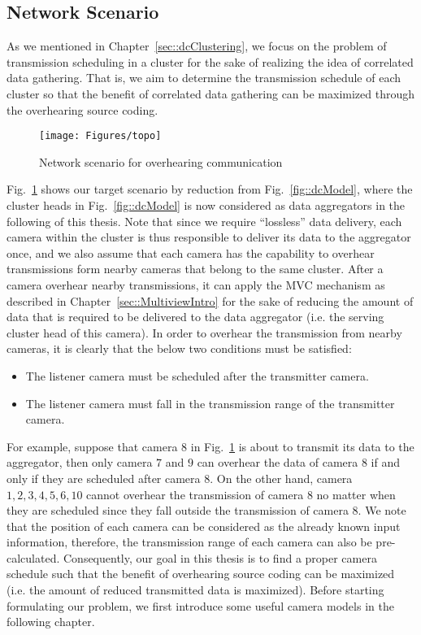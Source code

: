 \subsection{Network Scenario}
\label{sec::networkScenario}
%
As we mentioned in Chapter~\ref{sec::dcClustering}, we focus on the problem of transmission scheduling in a cluster for the sake of realizing the idea of correlated data gathering.
That is, we aim to determine the transmission schedule of each cluster so that the benefit of correlated data gathering can be maximized through the overhearing source coding.
%
\begin{figure}
\centering
\texttt{[image: Figures/topo]}
\caption{\label{fig::sysModel}Network scenario for overhearing communication}
\end{figure}
%
Fig.~\ref{fig::sysModel} shows our target scenario by reduction from Fig.~\ref{fig::dcModel}, where the cluster heads in Fig.~\ref{fig::dcModel} is now considered as data aggregators in the following of this thesis.
Note that since we require ``lossless'' data delivery, each camera within the cluster is thus responsible to deliver its data to the aggregator once, and we also assume that each camera has the capability to overhear transmissions form nearby cameras that belong to the same cluster.
After a camera overhear nearby transmissions, it can apply the MVC mechanism as described in Chapter~\ref{sec::MultiviewIntro} for the sake of reducing the amount of data that is required to be delivered to the data aggregator (i.e. the serving cluster head of this camera).
In order to overhear the transmission from nearby cameras, it is clearly that the below two conditions must be satisfied:
\begin{itemize}
\item The listener camera must be scheduled after the transmitter camera.
\item The listener camera must fall in the transmission range of the transmitter camera.
\end{itemize}
For example, suppose that camera $8$ in Fig.~\ref{fig::sysModel} is about to transmit its data to the aggregator, then only camera $7$ and $9$ can overhear the data of camera $8$ if and only if they are scheduled after camera $8$.
On the other hand, camera ${1,2,3,4,5,6,10}$ cannot overhear the transmission of camera $8$ no matter when they are scheduled since they fall outside the transmission of camera $8$.
We note that the position of each camera can be considered as the already known input information, therefore, the transmission range of each camera can also be pre-calculated.
Consequently, our goal in this thesis is to find a proper camera schedule such that the benefit of overhearing source coding can be maximized (i.e. the amount of reduced transmitted data is maximized).
Before starting formulating our problem, we first introduce some useful camera models in the following chapter.
